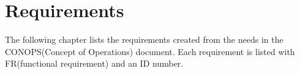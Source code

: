 \chapter{Requirements}
The following chapter lists the requirements created from the needs in the CONOPS(Concept of Operations) document. Each requirement is listed with FR(functional requirement) and an ID number. 







